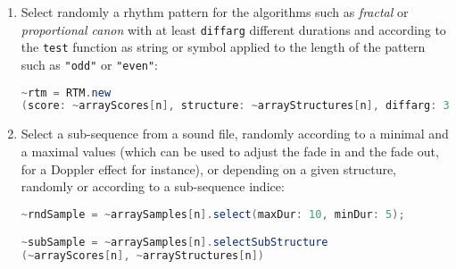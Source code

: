 \begin{enumerate}
    \item Select randomly a rhythm pattern for the algorithms such as \textsl{fractal} or \textsl{proportional canon} with at least \texttt{diffarg} different durations and according to the \texttt{test} function as string or symbol applied to the length of the pattern such as \texttt{"odd"} or \texttt{"even"}:
    
    \smallskip
    
\begin{lstlisting}[basicstyle=\footnotesize\ttfamily,language=Java]
~rtm = RTM.new
(score: ~arrayScores[n], structure: ~arrayStructures[n], diffarg: 3, test: \odd, limit: 10);	
\end{lstlisting}  
 \item Select a sub-sequence from a sound file, randomly according to a minimal and a maximal values (which can be used to adjust the fade in and the fade out, for a Doppler effect for instance), or depending on a given structure,  randomly or according to a sub-sequence indice:
 
 \smallskip
 
 \begin{lstlisting}[basicstyle=\footnotesize\ttfamily,language=Java]
~rndSample = ~arraySamples[n].select(maxDur: 10, minDur: 5);

~subSample = ~arraySamples[n].selectSubStructure
(~arrayScores[n], ~arrayStructures[n])
\end{lstlisting}  
\end{enumerate}
